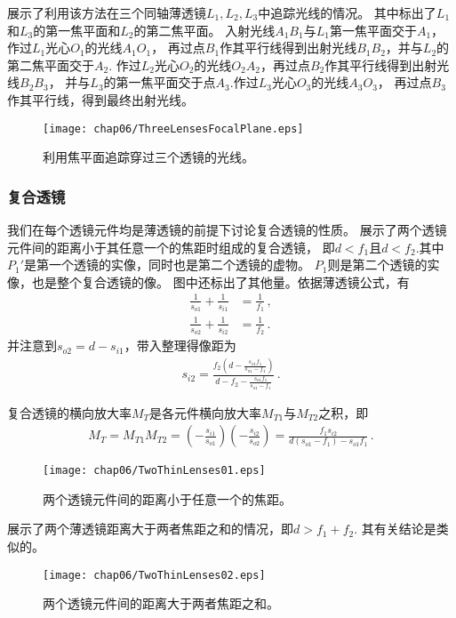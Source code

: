 展示了利用该方法在三个同轴薄透镜$L_1,L_2,L_3$中追踪光线的情况。
其中标出了$L_1$和$L_3$的第一焦平面和$L_2$的第二焦平面。
入射光线$A_1B_1$与$L_1$第一焦平面交于$A_1$，作过$L_1$光心$O_1$的光线$A_1O_1$，
再过点$B_1$作其平行线得到出射光线$B_1B_2$，并与$L_2$的第二焦平面交于$A_2$.
作过$L_2$光心$O_2$的光线$O_2A_2$，再过点$B_2$作其平行线得到出射光线$B_2B_3$，
并与$L_3$的第一焦平面交于点$A_3$.作过$L_3$光心$O_3$的光线$A_3O_3$，
再过点$B_3$作其平行线，得到最终出射光线。
\begin{figure}[htbp]
    \centering\texttt{[image: chap06/ThreeLensesFocalPlane.eps]}
    \caption{利用焦平面追踪穿过三个透镜的光线。}
    \label{fig:6.44}
\end{figure}

\subsubsection{复合透镜}
我们在每个透镜元件均是薄透镜的前提下讨论复合透镜的性质。
展示了两个透镜元件间的距离小于其任意一个的焦距时组成的复合透镜，
即$d<f_1$且$d<f_2$.其中$P_1'$是第一个透镜的实像，同时也是第二个透镜的虚物。
$P_1$则是第二个透镜的实像，也是整个复合透镜的像。
图中还标出了其他量。依据薄透镜公式，有
\begin{align}
    \frac{1}{s_{o1}}+\frac{1}{s_{i1}} & =\frac{1}{f_1}\, , \\
    \frac{1}{s_{o2}}+\frac{1}{s_{i2}} & =\frac{1}{f_2}\, .
\end{align}
并注意到$s_{o2}=d-s_{i1}$，带入整理得像距为
\begin{align}
    s_{i2}=\frac{f_2\left(d-\displaystyle\frac{s_{o1}f_1}{s_{o1}-f_1}\right)}{d-f_2-\displaystyle\frac{s_{o1}f_1}{s_{o1}-f_1}}\, .
\end{align}

复合透镜的横向放大率$M_T$是各元件横向放大率$M_{T1}$与$M_{T2}$之积，即
\begin{align}
    M_T=M_{T1}M_{T2}=\left(-\frac{s_{i1}}{s_{o1}}\right)\left(-\frac{s_{i2}}{s_{o2}}\right)=\frac{f_1s_{i2}}{d(s_{o1}-f_1)-s_{o1}f_1}\, .
\end{align}
\begin{figure}[htbp]
    \centering\texttt{[image: chap06/TwoThinLenses01.eps]}
    \caption{两个透镜元件间的距离小于任意一个的焦距。}
    \label{fig:6.45}
\end{figure}

展示了两个薄透镜距离大于两者焦距之和的情况，即$d>f_1+f_2$.
其有关结论是类似的。
\begin{figure}[htbp]
    \centering\texttt{[image: chap06/TwoThinLenses02.eps]}
    \caption{两个透镜元件间的距离大于两者焦距之和。}
    \label{fig:6.46}
\end{figure}


